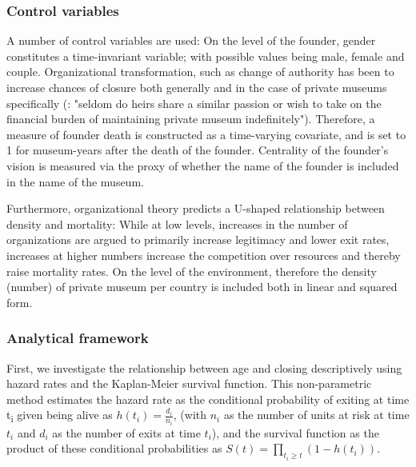 \documentclass[12pt]{article}
\begin{document}
\subsubsection*{Control variables}


\bigbreak
\noindent
A number of control variables are used: 
On the level of the founder, gender constitutes a time-invariant variable; with possible values being male, female and couple.
Organizational transformation, such as change of authority has been to increase chances of closure both generally \parencite{Carroll_Khessina_2019_demography} and in the case of private museums specifically (\cite[p.234]{Walker_2019_collector}: "seldom do heirs share a similar passion or wish to take on the financial burden of maintaining private museum indefinitely").
Therefore, a measure of founder death is constructed as a time-varying covariate, and is set to 1 for museum-years after the death of the founder. 
Centrality of the founder's vision is measured via the proxy of whether the name of the founder is included in the name of the museum.


Furthermore, organizational theory \parencite{hannan89_organ} predicts a U-shaped relationship between density and mortality:
While at low levels, increases in the number of organizations are argued to primarily increase legitimacy and lower exit rates, increases at higher numbers increase the competition over resources and thereby raise mortality rates.
On the level of the environment, therefore the density (number) of private museum per country is included both in linear and squared form.



\subsubsection*{Analytical framework}



First, we investigate the relationship between age and closing descriptively using hazard rates and the Kaplan-Meier survival function.
This non-parametric method estimates the hazard rate as the conditional probability of exiting at time t\textsubscript{i} given being alive as \(h(t_i) = \frac{d_i}{n_i}\), (with \(n_i\) as the number of units at risk at time \(t_i\) and \(d_i\) as the number of exits at time \(t_i\)), and the survival function as the product of these conditional probabilities as \(S(t) = \prod_{t_i \geq t} \left(1-h(t_i) \right)\).
\end{document}
